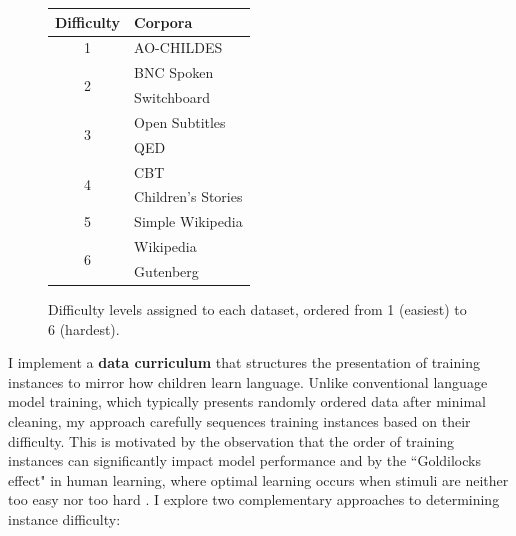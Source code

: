 \begin{figure}    
    \vspace{-1em}
    \centering
    \small
    \renewcommand{\arraystretch}{0.9}
    \begin{tabular}{cl}
    \toprule
    \textbf{Difficulty} & \textbf{Corpora} \\
    \midrule
    1 & AO-CHILDES \\
    \midrule
    \multirow{2}{*}{2} & BNC Spoken \\
                           & Switchboard \\
    \midrule
    \multirow{2}{*}{3} & Open Subtitles \\
                           & QED \\
    \midrule
    \multirow{2}{*}{4} & CBT \\
                           & Children's Stories \\
    \midrule
    5 & Simple Wikipedia \\
    \midrule
    \multirow{2}{*}{6} & Wikipedia \\
                           & Gutenberg \\
    \bottomrule
    \end{tabular}
    \caption{\label{tbl:source_order} Difficulty levels assigned to each dataset, ordered from 1 (easiest) to 6 (hardest).}
    \vspace{-2em}
\end{figure}

I implement a \textbf{data curriculum} that structures the presentation of training instances to mirror how children learn language. Unlike conventional language model training, which typically presents randomly ordered data after minimal cleaning, my approach carefully sequences training instances based on their difficulty. This is motivated by the observation that the order of training instances can significantly impact model performance \citep{schluter2018data} and by the ``Goldilocks effect" in human learning, where optimal learning occurs when stimuli are neither too easy nor too hard \citep{kidd2012goldilocks}. I explore two complementary approaches to determining instance difficulty:

